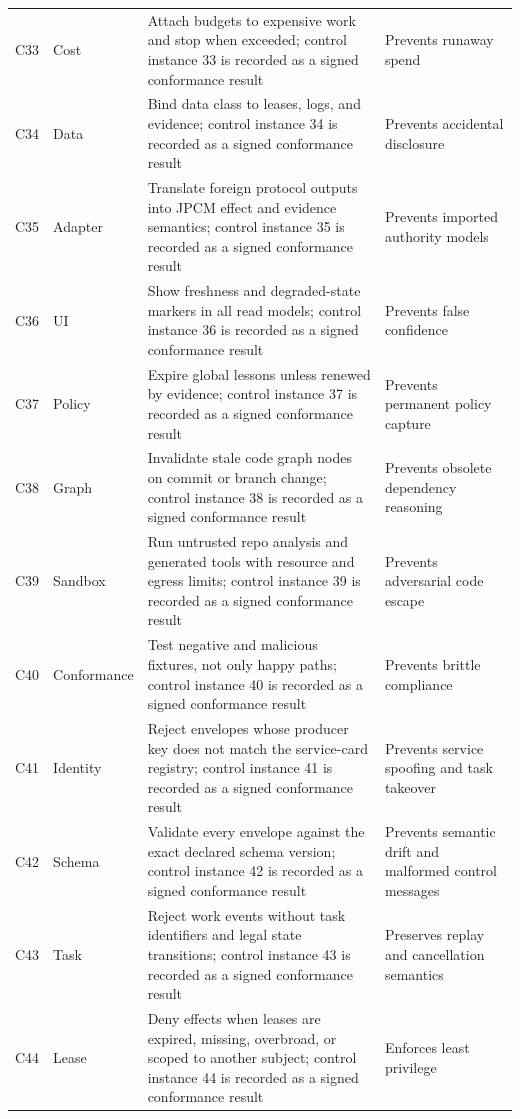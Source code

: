 \documentclass[10pt,journal,onecolumn]{IEEEtran}
\begin{document}
\begin{longtable}{P{0.06\textwidth} P{0.14\textwidth} P{0.48\textwidth} P{0.24\textwidth}}
C33 & Cost & Attach budgets to expensive work and stop when exceeded; control instance 33 is recorded as a signed conformance result & Prevents runaway spend \\
C34 & Data & Bind data class to leases, logs, and evidence; control instance 34 is recorded as a signed conformance result & Prevents accidental disclosure \\
C35 & Adapter & Translate foreign protocol outputs into JPCM effect and evidence semantics; control instance 35 is recorded as a signed conformance result & Prevents imported authority models \\
C36 & UI & Show freshness and degraded-state markers in all read models; control instance 36 is recorded as a signed conformance result & Prevents false confidence \\
C37 & Policy & Expire global lessons unless renewed by evidence; control instance 37 is recorded as a signed conformance result & Prevents permanent policy capture \\
C38 & Graph & Invalidate stale code graph nodes on commit or branch change; control instance 38 is recorded as a signed conformance result & Prevents obsolete dependency reasoning \\
C39 & Sandbox & Run untrusted repo analysis and generated tools with resource and egress limits; control instance 39 is recorded as a signed conformance result & Prevents adversarial code escape \\
C40 & Conformance & Test negative and malicious fixtures, not only happy paths; control instance 40 is recorded as a signed conformance result & Prevents brittle compliance \\
C41 & Identity & Reject envelopes whose producer key does not match the service-card registry; control instance 41 is recorded as a signed conformance result & Prevents service spoofing and task takeover \\
C42 & Schema & Validate every envelope against the exact declared schema version; control instance 42 is recorded as a signed conformance result & Prevents semantic drift and malformed control messages \\
C43 & Task & Reject work events without task identifiers and legal state transitions; control instance 43 is recorded as a signed conformance result & Preserves replay and cancellation semantics \\
C44 & Lease & Deny effects when leases are expired, missing, overbroad, or scoped to another subject; control instance 44 is recorded as a signed conformance result & Enforces least privilege \\

\end{longtable}
\end{document}

